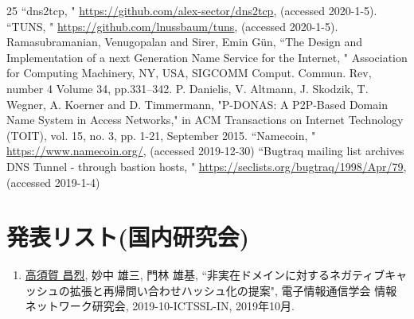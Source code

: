 \documentclass[12pt]{jarticle} %
\begin{document}
\begin{thebibliography} {25}
  ``dns2tcp, " \href{https://github.com/alex-sector/dns2tcp}{https://github.com/alex-sector/dns2tcp}, (accessed 2020-1-5).
  ``TUNS, " \href{https://github.com/lnussbaum/tuns}{https://github.com/lnussbaum/tuns}, (accessed 2020-1-5).
  Ramasubramanian, Venugopalan and Sirer, Emin G\"{u}n, ``The Design and Implementation of a next Generation Name Service for the Internet, " Association for Computing Machinery, NY, USA, SIGCOMM Comput. Commun. Rev, number 4 Volume 34, pp.331–342.
  P. Danielis, V. Altmann, J. Skodzik, T. Wegner, A. Koerner and D. Timmermann, "P-DONAS: A P2P-Based Domain Name System in Access Networks," in ACM Transactions on Internet Technology (TOIT), vol. 15, no. 3, pp. 1-21, September 2015.
  ``Namecoin, " \href{https://www.namecoin.org/}{https://www.namecoin.org/}, (accessed 2019-12-30)
  ``Bugtraq mailing list archives DNS Tunnel - through bastion hosts, " \href{https://seclists.org/bugtraq/1998/Apr/79}{https://seclists.org/bugtraq/1998/Apr/79}, (accessed 2019-1-4)
\end{thebibliography}





\appendix

\section{発表リスト(国内研究会)}
\begin{enumerate}
 \item \underline{高須賀 昌烈}, 妙中 雄三, 門林 雄基, ``非実在ドメインに対するネガティブキャッシュの拡張と再帰問い合わせハッシュ化の提案", 電子情報通信学会 情報ネットワーク研究会, 2019-10-ICTSSL-IN, 2019年10月.
\end{enumerate}
\end{document}
